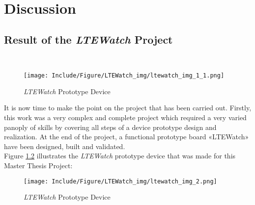 \documentclass[Report.tex]{subfiles}
\begin{document}
\chapter{Discussion}

\section{Result of the \textit{LTEWatch} Project}
\;\\[-50pt]
\begin{figure}[H]
	\centering
	\texttt{[image: Include/Figure/LTEWatch\_img/ltewatch\_img\_1\_1.png]}
	\caption{\textit{LTEWatch} Prototype Device}
	\label{fig:ltewatch_img_1_1}
\end{figure}

It is now time to make the point on the project that has been carried out. Firstly, this work was a very complex and complete project which required a very varied panoply of skills by covering all steps of a device prototype design and realization. At the end of the project, a functional prototype board «LTEWatch» have been designed, built and validated.\\

Figure \ref{fig:ltewatch_img_2} illustrates the \textit{LTEWatch} prototype device that was made for this Master Thesis Project:

\begin{figure}[H]
	\centering
	\texttt{[image: Include/Figure/LTEWatch\_img/ltewatch\_img\_2.png]}
	\caption{\textit{LTEWatch} Prototype Device}
	\label{fig:ltewatch_img_2}
\end{figure}
\end{document}
